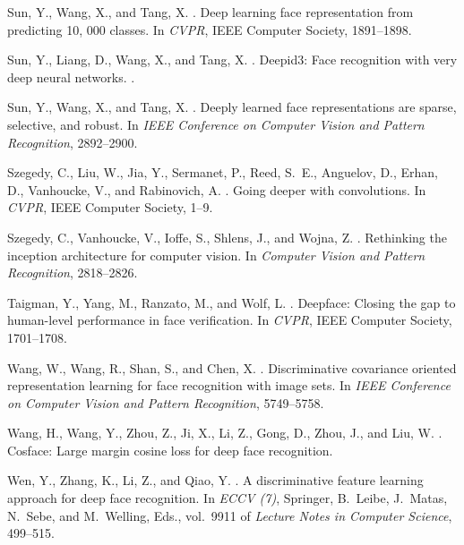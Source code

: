 \documentclass[conference]{acmsiggraph}
\begin{document}
\begin{thebibliography}{\protect{}1998}
{\sc Sun, Y., Wang, X., and Tang, X.}
.
\newblock Deep learning face representation from predicting 10, 000 classes.
\newblock In {\em CVPR}, IEEE Computer Society, 1891--1898.

{\sc Sun, Y., Liang, D., Wang, X., and Tang, X.}
.
\newblock Deepid3: Face recognition with very deep neural networks.
.

{\sc Sun, Y., Wang, X., and Tang, X.}
.
\newblock Deeply learned face representations are sparse, selective, and
  robust.
\newblock In {\em IEEE Conference on Computer Vision and Pattern Recognition},
  2892--2900.

{\sc Szegedy, C., Liu, W., Jia, Y., Sermanet, P., Reed, S.~E., Anguelov, D.,
  Erhan, D., Vanhoucke, V., and Rabinovich, A.}
.
\newblock Going deeper with convolutions.
\newblock In {\em CVPR}, IEEE Computer Society, 1--9.

{\sc Szegedy, C., Vanhoucke, V., Ioffe, S., Shlens, J., and Wojna, Z.}
.
\newblock Rethinking the inception architecture for computer vision.
\newblock In {\em Computer Vision and Pattern Recognition}, 2818--2826.

{\sc Taigman, Y., Yang, M., Ranzato, M., and Wolf, L.}
.
\newblock Deepface: Closing the gap to human-level performance in face
  verification.
\newblock In {\em CVPR}, IEEE Computer Society, 1701--1708.

{\sc Wang, W., Wang, R., Shan, S., and Chen, X.}
.
\newblock Discriminative covariance oriented representation learning for face
  recognition with image sets.
\newblock In {\em IEEE Conference on Computer Vision and Pattern Recognition},
  5749--5758.

{\sc Wang, H., Wang, Y., Zhou, Z., Ji, X., Li, Z., Gong, D., Zhou, J., and Liu,
  W.}
.
\newblock Cosface: Large margin cosine loss for deep face recognition.

{\sc Wen, Y., Zhang, K., Li, Z., and Qiao, Y.}
.
\newblock A discriminative feature learning approach for deep face recognition.
\newblock In {\em ECCV (7)}, Springer, B.~Leibe, J.~Matas, N.~Sebe, and
  M.~Welling, Eds., vol.~9911 of {\em Lecture Notes in Computer Science},
  499--515.


\end{thebibliography}
\end{document}
